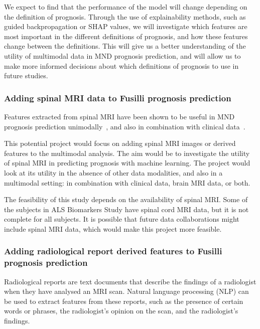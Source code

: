 We expect to find that the performance of the model will change depending on the definition of prognosis.
Through the use of explainability methods, such as guided backpropagation or SHAP values, we will investigate which features are most important in the different definitions of prognosis, and how these features change between the definitions.
This will give us a better understanding of the utility of multimodal data in MND prognosis prediction, and will allow us to make more informed decisions about which definitions of prognosis to use in future studies.


\subsubsection*{Adding spinal MRI data to Fusilli prognosis prediction}

Features extracted from spinal MRI have been shown to be useful in MND prognosis prediction unimodally~\cite{brancoSpinalCordAtrophy2014, grolezMRICervicalSpinal2018}, and also in combination with clinical data~\cite{querinSpinalCordMultiparametric2017}.

This potential project would focus on adding spinal MRI images or derived features to the multimodal analysis.
The aim would be to investigate the utility of spinal MRI in predicting prognosis with machine learning.
The project would look at its utility in the absence of other data modalities, and also in a multimodal setting: in combination with clinical data, brain MRI data, or both.

The feasibility of this study depends on the availability of spinal MRI.
Some of the subjects in ALS Biomarkers Study have spinal cord MRI data, but it is not complete for all subjects.
It is possible that future data collaborations might include spinal MRI data, which would make this project more feasible.

\subsubsection{Adding radiological report derived features to Fusilli prognosis prediction}

Radiological reports are text documents that describe the findings of a radiologist when they have analysed an MRI scan.
Natural language processing (NLP) can be used to extract features from these reports, such as the presence of certain words or phrases, the radiologist's opinion on the scan, and the radiologist's findings.

